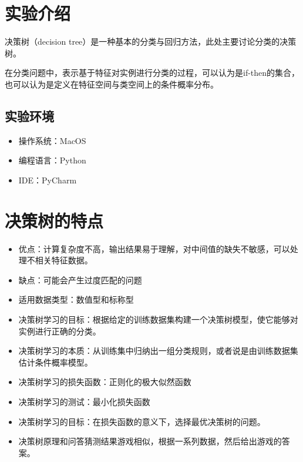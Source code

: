 \documentclass{ML}
\begin{document}
\maketitle

\tableofcontents
\newpage

\section{实验介绍}

决策树（decision tree）是一种基本的分类与回归方法，此处主要讨论分类的决策树。

在分类问题中，表示基于特征对实例进行分类的过程，可以认为是if-then的集合，也可以认为是定义在特征空间与类空间上的条件概率分布。

\subsection{实验环境}

\begin{itemize}
	\item 操作系统：MacOS
	\item 编程语言：Python
	\item IDE：PyCharm
\end{itemize}

\section{决策树的特点}

\begin{itemize}
	\item 优点：计算复杂度不高，输出结果易于理解，对中间值的缺失不敏感，可以处理不相关特征数据。
	\item 缺点：可能会产生过度匹配的问题
	\item 适用数据类型：数值型和标称型

	\item 决策树学习的目标：根据给定的训练数据集构建一个决策树模型，使它能够对实例进行正确的分类。
	\item 决策树学习的本质：从训练集中归纳出一组分类规则，或者说是由训练数据集估计条件概率模型。
	\item 决策树学习的损失函数：正则化的极大似然函数
	\item 决策树学习的测试：最小化损失函数
	\item 决策树学习的目标：在损失函数的意义下，选择最优决策树的问题。
	\item 决策树原理和问答猜测结果游戏相似，根据一系列数据，然后给出游戏的答案。
\end{itemize}
\end{document}
